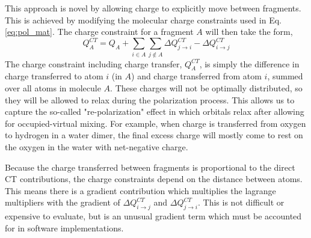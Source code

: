 \documentclass[journal=jctcce,manuscript=article]{achemso}
\begin{document}
This approach is novel by allowing charge to explicitly move between fragments. This is achieved by modifying the molecular charge constraints used in Eq. \ref{eq:pol_mat}. The charge constraint for a fragment $A$ will then take the form,
\begin{equation}
  Q^{CT}_A=Q_A+\sum_{i\in A}\sum_{j\notin A}\Delta Q^{CT}_{j\rightarrow i}-\Delta Q^{CT}_{i\rightarrow j}
  \label{eq:charge_constraint}
\end{equation}
The charge constraint including charge transfer, $Q^{CT}_A$, is simply the difference in charge transferred to atom $i$ (in $A$) and charge transferred from atom $i$, summed over all atoms in molecule $A$. These charges will not be optimally distributed, so they will be allowed to relax during the polarization process. This allows us to capture the so-called "re-polarization"\cite{khaliullin2007} effect in which orbitals relax after allowing for occupied-virtual mixing. For example, when charge is transferred from oxygen to hydrogen in a water dimer, the final excess charge will mostly come to rest on the oxygen in the water with net-negative charge.

Because the charge transferred between fragments is proportional to the direct CT contributions, the charge constraints depend on the distance between atoms. This means there is a gradient contribution which multiplies the lagrange multipliers with the gradient of $\Delta Q^{CT}_{i\rightarrow j}$ and $\Delta Q^{CT}_{j\rightarrow i}$. This is not difficult or expensive to evaluate, but is an  unusual gradient term which must be accounted for in software implementations.
\end{document}
